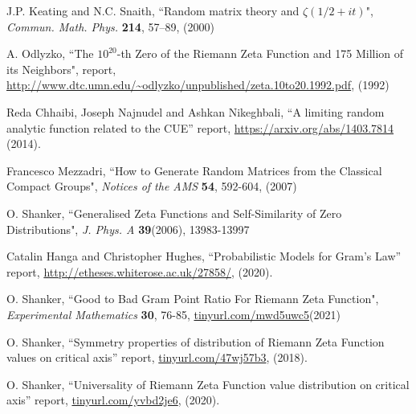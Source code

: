 \documentclass[twoside]{article}
\begin{document}

\begin{thebibliography}{10}

 J.P. Keating and N.C. Snaith, 
``Random matrix theory and $\zeta (1/2+it)$", 
{\it Commun. Math. Phys.} {\bf 214}, 57–89, (2000)

  A. Odlyzko,
``The $10^{20}$-th Zero of the Riemann Zeta
Function and 175 Million of its Neighbors", report,
\url{http://www.dtc.umn.edu/~odlyzko/unpublished/zeta.10to20.1992.pdf}, (1992)

 Reda Chhaibi, Joseph Najnudel and Ashkan Nikeghbali,
``A limiting random analytic function related to the CUE''
report,
\url{https://arxiv.org/abs/1403.7814}
(2014).

Francesco Mezzadri,
``How to Generate Random Matrices from the Classical
Compact Groups", {\it Notices of the AMS} {\bf 54}, 592-604, (2007)

 O. Shanker, 
``Generalised Zeta Functions and Self-Similarity of Zero Distributions",
{\it J.  Phys. A} {\bf39}(2006), 13983-13997

 Catalin Hanga and Christopher Hughes, 
``Probabilistic Models for Gram's Law''
 report,
\url{http://etheses.whiterose.ac.uk/27858/}, 
(2020). 

 O. Shanker, 
``Good to Bad Gram Point Ratio For Riemann Zeta Function",
{\it Experimental Mathematics} {\bf 30}, 76-85,
\url{tinyurl.com/mwd5uwc5}(2021)

 O. Shanker, 
``Symmetry properties of distribution of Riemann Zeta Function values on critical axis''
 report,
\url{tinyurl.com/47wj57b3}, 
(2018). 

 O. Shanker, 
``Universality of Riemann Zeta Function value distribution on critical axis''
 report,
\url{tinyurl.com/yvbd2je6}, 
(2020). 




\end{thebibliography} 
\end{document}
